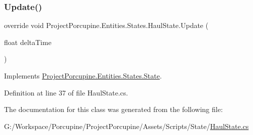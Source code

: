 \subsubsection{\texorpdfstring{Update()}{Update()}}
{\footnotesize\ttfamily override void Project\+Porcupine.\+Entities.\+States.\+Haul\+State.\+Update (\begin{DoxyParamCaption}\item[{float}]{delta\+Time }\end{DoxyParamCaption})\hspace{0.3cm}{\ttfamily [virtual]}}



Implements \hyperlink{class_project_porcupine_1_1_entities_1_1_states_1_1_state_a46337df73c448f5dd84e350e987af8b5}{Project\+Porcupine.\+Entities.\+States.\+State}.



Definition at line 37 of file Haul\+State.\+cs.



The documentation for this class was generated from the following file\+:\begin{DoxyCompactItemize}
\item 
G\+:/\+Workspace/\+Porcupine/\+Project\+Porcupine/\+Assets/\+Scripts/\+State/\hyperlink{_haul_state_8cs}{Haul\+State.\+cs}\end{DoxyCompactItemize}
